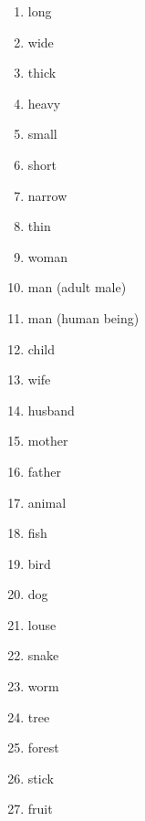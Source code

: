 \begin{enumerate}
\item   long 

\item   wide 

\item   thick 

\item   heavy 

\item   small 

\item   short 

\item   narrow 

\item   thin 

\item   woman 

\item   man (adult male) 

\item   man (human being) 

\item   child 

\item   wife 

\item   husband 

\item   mother 

\item   father 

\item   animal 

\item   fish 

\item   bird 

\item   dog 

\item   louse 

\item   snake 

\item   worm 

\item   tree 

\item   forest 

\item   stick 

\item   fruit 


\end{enumerate}
